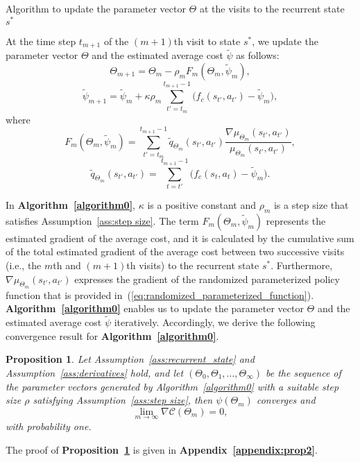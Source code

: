 \documentclass[twocolumn,10pt]{IEEEtran}
\newtheorem{proposition}{Proposition} %
\begin{document}
\begin{algorithm}
	\caption{Algorithm to update the parameter vector $\Theta$ at the visits to the recurrent state $s^{*}$}
	\label{algorithm0}
	At the time step $t_{m+1}$ of the $(m+1)$th visit to state $s^{*}$, we update the parameter vector $\Theta$ and the estimated average cost $\widetilde{\psi}$ as follows: \\
	\begin{equation}
	\Theta_{m+1} = \Theta_{m} - \rho_{m} F_{m} (\Theta_{m},\widetilde{\psi}_{m}),
	\end{equation}
	\begin{equation}
	\widetilde{\psi}_{m+1} = \widetilde{\psi}_{m} + \kappa \rho_{m}\sum_{t'=t_{m}}^{t_{m+1}-1}\Big( f_c (s_{t'}, a_{t'}) - \widetilde{\psi}_{m} \Big)	,
	\end{equation}
	where
	\begin{equation}
	F_{m}(\Theta_{m},\widetilde{\psi}_{m}) = \sum_{t'=t_{m}}^{t_{m+1}-1} \widetilde{q}_{\Theta_{m}}(s_{t'},a_{t'}) \frac{\nabla \mu_{\Theta_{m}}(s_{t'},a_{t'})}{\mu_{\Theta_{m}}(s_{t'},a_{t'})},
	\end{equation}
	\begin{equation}
	\widetilde{q}_{\Theta_{m}}(s_{t'},a_{t'}) = \sum_{t=t'}^{t_{m+1}-1}\Big( f_c (s_{t}, a_{t}) - \widetilde{\psi}_{m}\Big).
	\end{equation}
\end{algorithm}

In \textbf{Algorithm~\ref{algorithm0}}, $\kappa$ is a positive constant and $\rho_{m}$ is a step size that satisfies Assumption~\ref{ass:step size}. The term $F_{m}(\Theta_{m},\widetilde{\psi}_{m})$ represents the estimated gradient of the average cost, and it is calculated by the cumulative sum of the total estimated gradient of the average cost between two successive visits (i.e., the $m$th and $(m+1)$th visits) to the recurrent state $s^*$. Furthermore, $\nabla \mu_{\Theta_{m}}(s_{t'},a_{t'})$ expresses the gradient of the randomized parameterized policy function that is provided in~(\ref{eq:randomized_parameterized_function}). \textbf{Algorithm~\ref{algorithm0}} enables us to update the parameter vector $\Theta$ and the estimated average cost $\widetilde{\psi}$ iteratively. Accordingly, we derive the following convergence result for \textbf{Algorithm~\ref{algorithm0}}.

\begin{proposition}
	\label{prop2}
	Let Assumption~\ref{ass:recurrent_state} and Assumption~\ref{ass:derivatives} hold, and let $(\Theta_{0}, \Theta_{1}, \ldots, \Theta_{\infty})$ be the sequence of the parameter vectors generated by Algorithm~\ref{algorithm0} with a suitable step size $\rho$ satisfying Assumption~\ref{ass:step size}, then  $\psi({\Theta_{m}})$ converges and 
	\begin{equation}
	\lim_{m\rightarrow \infty} \nabla \mathcal{C} (\Theta_{m}) = 0,
	\end{equation}
	with probability one. 
\end{proposition}
The proof of \textbf{Proposition~\ref{prop2}} is given in \textbf{Appendix~\ref{appendix:prop2}}.
\end{document}
